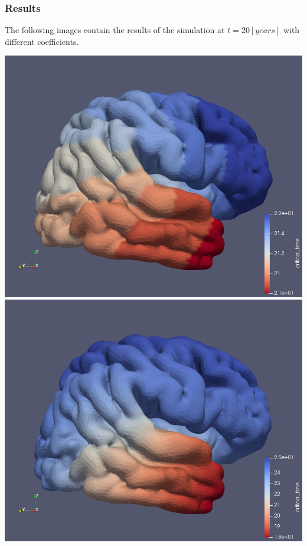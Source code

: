 \documentclass[12pt, letterpaper]{article}
\begin{document}
\subsubsection{Results}
The following images contain the results of the simulation at $t=20[years]$ with different coefficients.

\noindent\includegraphics[scale=0.1]{pics/base.png}
\includegraphics[scale=0.1]{pics/reddiff.png}
\end{document}
